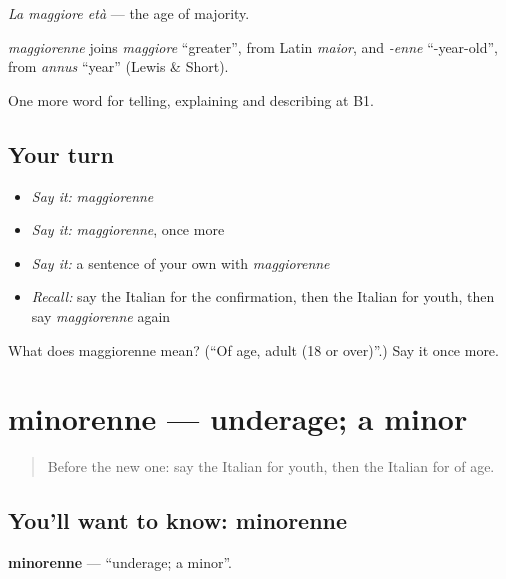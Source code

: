 \emph{La maggiore età} — the age of majority.

\begin{cousinweb}
\emph{maggiorenne} joins \emph{maggiore} \textquotedblleft{}greater\textquotedblright{}, from Latin \emph{maior}, and \emph{-enne} \textquotedblleft{}-year-old\textquotedblright{}, from \emph{annus} \textquotedblleft{}year\textquotedblright{} (Lewis \& Short).
\end{cousinweb}

\begin{grammarlens}[title={What you've built}]
One more word for telling, explaining and describing at B1.
\end{grammarlens}

\subsection*{Your turn}
\begin{itemize}
\raggedright
  \item \emph{Say it:} \emph{maggiorenne}
  \item \emph{Say it:} \emph{maggiorenne}, once more
  \item \emph{Say it:} a sentence of your own with \emph{maggiorenne}
  \item \emph{Recall:} say the Italian for the confirmation, then the Italian for youth, then say \emph{maggiorenne} again
\end{itemize}

\begin{tcolorbox}[breakable,colback=teal!4,colframe=teal!35!black,title={Before you move on}]
What does maggiorenne mean? (\textquotedblleft{}Of age, adult (18 or over)\textquotedblright{}.) Say it once more.
\end{tcolorbox}
\section[minorenne]{minorenne — underage; a minor}

\label{lesson:IT-C309-minorenne}



\begin{quote}
Before the new one: say the Italian for youth, then the Italian for of age.
\end{quote}

\subsection*{You'll want to know: minorenne}
\textbf{minorenne} — \textquotedblleft{}underage; a minor\textquotedblright{}.

